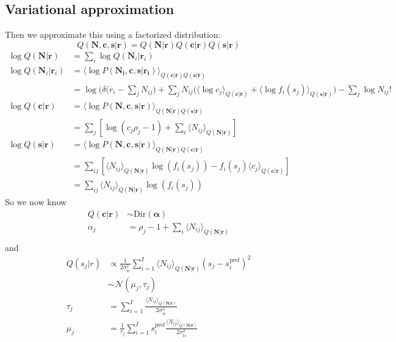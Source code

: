 \documentclass[12pt]{article}
\begin{document}
\subsection{Variational approximation}
Then we approximate this using a factorized distribution:
\begin{equation}
Q(\mathbf{N, c, s|r}) = Q(\mathbf{N|r}) Q(\mathbf{c|r}) Q(\mathbf{s|r})
\end{equation}
\begin{equation}
\begin{aligned}
\log Q(\mathbf{N}|\mathbf{r}) &= \sum_i \log Q(\mathbf{N}_i|\mathbf{r}_i)\\
\log Q(\mathbf{N}_i|\mathbf{r}_i) &= \langle \log P(\mathbf{N_i, c, s|r_i}) \rangle_{Q(\mathbf{c|r})Q(\mathbf{s|r})}\\
&= \log(\delta \Big( r_i - \sum_j N_{ij} \Big) + \sum_j N_{ij}\big( \langle \log c_j \rangle_{Q(\mathbf{c|r})} + \langle \log f_i(s_j) \rangle_{Q(\mathbf{s|r})} \big) - \sum_j \log N_{ij}!\\
\log Q(\mathbf{c|r}) &= \langle \log P(\mathbf{N, c, s|r}) \rangle_{Q(\mathbf{N|r})Q(\mathbf{s|r})}\\
&= \sum_j [\log (c_j \rho_j - 1) + \sum_i \langle N_{ij} \rangle_{Q(\mathbf{N|r})}]\\
\log Q(\mathbf{s|r}) &= \langle \log P(\mathbf{N, c, s|r}) \rangle_{Q(\mathbf{N|r})Q(\mathbf{c|r})}\\
&= \sum_{ij} [\langle N_{ij} \rangle_{Q(\mathbf{N|r})} \log(f_i(s_j)) - f_i(s_j) \langle c_j \rangle_{Q(\mathbf{c|r})}]\\ 
&= \sum_{ij} \langle N_{ij} \rangle_{Q(\mathbf{N|r})} \log(f_i(s_j))
\end{aligned}
\end{equation}
So we now know
\begin{equation}
\begin{aligned}
Q(\mathbf{c|r}) &\sim \text{Dir}(\boldsymbol{\alpha})\\
\alpha_j &= \rho_j - 1 + \sum_i \langle N_{ij} \rangle_{Q(\mathbf{N|r})}\\
\end{aligned}
\end{equation}
and 
\begin{equation}
\begin{aligned}
Q(s_j|r) &\propto \frac{1}{2 \sigma_{\text{tc}}^2} \sum_{i=1}^I \langle N_{ij} \rangle_{Q(\mathbf{N|r})} (s_j - s_i^{\text{pref}})^2\\
&\sim \mathcal{N} (\mu_j, \tau_j)\\ 
\tau_j &= \sum_{i=1}^I \frac{\langle N_{ij} \rangle_{Q(\mathbf{N|r})}}{2 \sigma_{\text{tc}}^2}\\
\mu_j &= \frac{1}{\tau_j} \sum_{i=1}^I s_i^{\text{pref}} \frac{\langle N_{ij} \rangle_{Q(\mathbf{N|r})}}{2 \sigma_{\text{tc}}^2}\\
\end{aligned}
\end{equation}
\end{document}
